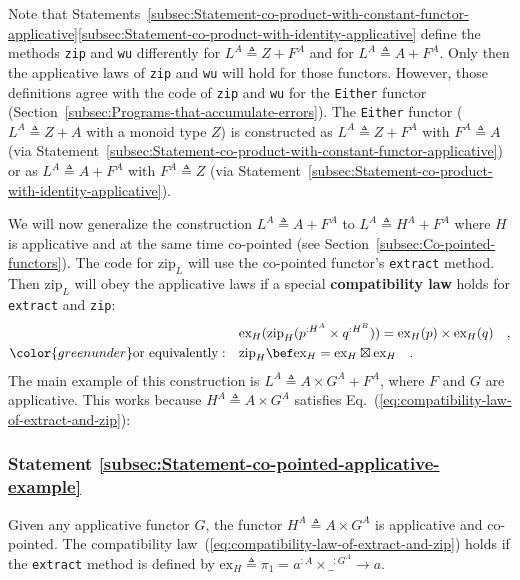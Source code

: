 Note that Statements~\ref{subsec:Statement-co-product-with-constant-functor-applicative}\textendash \ref{subsec:Statement-co-product-with-identity-applicative}
define the methods \lstinline!zip! and \lstinline!wu! differently
for $L^{A}\triangleq Z+F^{A}$ and for $L^{A}\triangleq A+F^{A}$.
Only then the applicative laws of \lstinline!zip! and \lstinline!wu!
will hold for those functors. However, those definitions agree with
the code of \lstinline!zip! and \lstinline!wu! for the \lstinline!Either!
functor (Section~\ref{subsec:Programs-that-accumulate-errors}).
The \lstinline!Either! functor ($L^{A}\triangleq Z+A$ with a monoid
type $Z$) is constructed as $L^{A}\triangleq Z+F^{A}$ with $F^{A}\triangleq A$
(via Statement~\ref{subsec:Statement-co-product-with-constant-functor-applicative})
or as $L^{A}\triangleq A+F^{A}$ with $F^{A}\triangleq Z$ (via Statement~\ref{subsec:Statement-co-product-with-identity-applicative}).

We will now generalize the construction $L^{A}\triangleq A+F^{A}$
to $L^{A}\triangleq H^{A}+F^{A}$ where $H$ is applicative and at
the same time co-pointed (see Section~\ref{subsec:Co-pointed-functors}).
The code for $\text{zip}_{L}$ will use the co-pointed functor\textsf{'}s \lstinline!extract!
method. Then $\text{zip}_{L}$ will obey the applicative laws if a
special \textbf{compatibility law}
holds for \lstinline!extract! and \lstinline!zip!:
\begin{align}
 & \text{ex}_{H}(\text{zip}_{H}(p^{:H^{A}}\times q^{:H^{B}}))=\text{ex}_{H}(p)\times\text{ex}_{H}(q)\quad,\nonumber \\
{\color{greenunder}\text{or equivalently}:}\quad & \text{zip}_{H}\bef\text{ex}_{H}=\text{ex}_{H}\boxtimes\text{ex}_{H}\quad.\label{eq:compatibility-law-of-extract-and-zip}
\end{align}
The main example of this construction is $L^{A}\triangleq A\times G^{A}+F^{A}$,
where $F$ and $G$ are applicative. This works because $H^{A}\triangleq A\times G^{A}$
satisfies Eq.~(\ref{eq:compatibility-law-of-extract-and-zip}):

\subsubsection{Statement \label{subsec:Statement-co-pointed-applicative-example}\ref{subsec:Statement-co-pointed-applicative-example}}

Given any applicative functor $G$, the functor $H^{A}\triangleq A\times G^{A}$
is applicative and co-pointed. The compatibility law~(\ref{eq:compatibility-law-of-extract-and-zip})
holds if the \lstinline!extract! method is defined by $\text{ex}_{H}\triangleq\pi_{1}=a^{:A}\times\_^{:G^{A}}\rightarrow a$.

